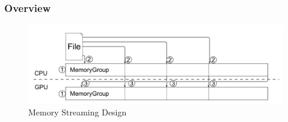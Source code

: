 \subsubsection{Overview}


\begin{figure}
\centering
\includegraphics[scale=0.23]{fig/memory_group.pdf}
\caption{Memory Streaming Design}
\label{fig:memorygroup}
\centering
\end{figure}